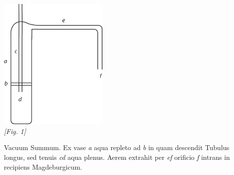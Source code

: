             \pend            
       \begin{center}
                \includegraphics[width=0.4\textwidth]{images/LH35_14_2_95v}
                \\\textit{[Fig. 1]}
                       \end{center} 
                       \pstart   {} Vacuum Summum.  Ex vase \textit{a} aqua  repleto ad \textit{b} in quam  descendit Tubulus longus, sed  tenuis \textit{cd}  aqua plenus. Aerem extrahit per \textit{ef} orificio \textit{f}  intrans in recipiens Magdeburgicum\protect{}.  
